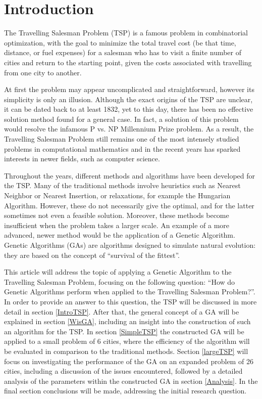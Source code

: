 \newpage 
\section{Introduction}

\par
The Travelling Salesman Problem (TSP) is a famous problem in combinatorial optimization, with the goal to minimize the total travel cost (be that time, distance, or fuel expenses) for a salesman who has to visit a finite number of cities and return to the starting point, given the costs associated with travelling from one city to another.

\par
At first the problem may appear uncomplicated and straightforward, however its simplicity is only an illusion. Although the exact origins of the TSP are unclear, it can be dated back to at least 1832, yet to this day, there has been no effective solution method found for a general case. In fact, a solution of this problem would resolve the infamous P vs. NP Millennium Prize problem. As a result, the Travelling Salesman Problem still remains one of the most intensely studied problems in computational mathematics and in the recent years has sparked interests in newer fields, such as computer science.

\par
Throughout the years, different methods and algorithms have been developed for the TSP. Many of the traditional methods involve heuristics such as Nearest Neighbor or Nearest Insertion, or relaxations, for example the Hungarian Algorithm. However, these do not necessarily give the optimal, and for the latter sometimes not even a feasible solution. Moreover, these methods become insufficient when the problem takes a larger scale. An example of a more advanced, newer method would be the application of a Genetic Algorithm. Genetic Algorithms (GAs) are algorithms designed to simulate natural evolution: they are based on the concept of “survival of the fittest”.

\par
This article will address the topic of applying a Genetic Algorithm to the Travelling Salesman Problem, focusing on the following question: “How do Genetic Algorithms perform when applied to the Travelling Salesman Problem?”. In order to provide an answer to this question, the TSP will be discussed in more detail in section \ref{IntroTSP}. After that, the general concept of a GA will be explained in section \ref{WisGA}, including an insight into the construction of such an algorithm for the TSP. In section \ref{SimpleTSP} the constructed GA will be applied to a small problem of 6 cities, where the efficiency of the algorithm will be evaluated in comparison to the traditional methods. Section \ref{largeTSP} will focus on investigating the performance of the GA on an expanded problem of 26 cities, including a discussion of the issues encountered, followed by a detailed analysis of the parameters within the constructed GA in section \ref{Analysis}. In the final section conclusions will be made, addressing the initial research question.



